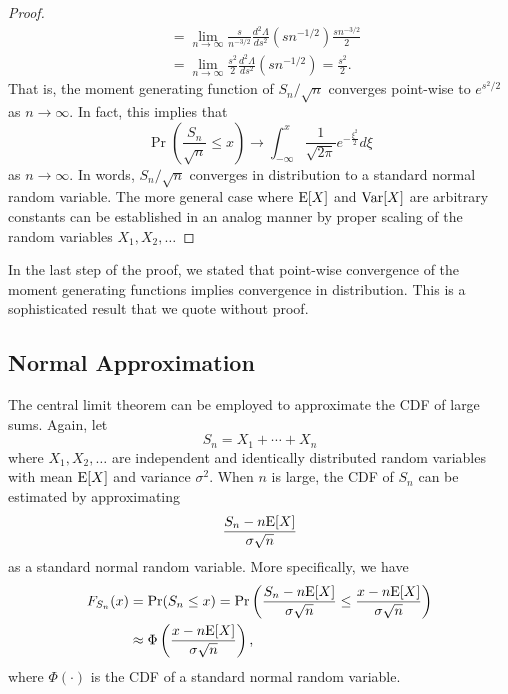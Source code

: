 \begin{proof}
\begin{equation*}
\begin{split}
&= \lim_{n \rightarrow \infty} \frac{s}{n^{-3/2}}
\frac{d^2 \Lambda}{ds^2} \left( s n^{-1/2} \right) \frac{s n^{-3/2}}{2} \\
&= \lim_{n \rightarrow \infty} \frac{s^2}{2}
\frac{d^2 \Lambda}{ds^2} \left( s n^{-1/2} \right) = \frac{s^2}{2} .
\end{split}
\end{equation*}
That is, the moment generating function of $S_n / \sqrt{n}$ converges point-wise to $e^{s^2/2}$ as $n \rightarrow \infty$.
In fact, this implies that
\begin{equation*}
\Pr \left( \frac{S_n}{\sqrt{n}} \leq x \right) \rightarrow \int_{-\infty}^x \frac{1}{\sqrt{2 \pi}} e^{-\frac{\xi^2}{2}} d\xi
\end{equation*}
as $n \rightarrow \infty$.
In words, $S_n / \sqrt{n}$ converges in distribution to a standard normal random variable.
The more general case where $\mathrm{E} [X]$ and $\mathrm{Var} [X]$ are arbitrary constants can be established in an analog manner by proper scaling of the random variables $X_1, X_2, \ldots$
\end{proof}

In the last step of the proof, we stated that point-wise convergence of the moment generating functions implies convergence in distribution.
This is a sophisticated result that we quote without proof.


\subsection{Normal Approximation}

The central limit theorem can be employed to approximate the CDF of large sums.
Again, let
\begin{equation*}
S_n = X_1 + \cdots + X_n
\end{equation*}
where $X_1, X_2, \ldots$ are independent and identically distributed random variables with mean $\mathrm{E} [X]$ and variance $\sigma^2$.
When $n$ is large, the CDF of $S_n$ can be estimated by approximating
\begin{equation*}
\frac{ S_n - n \mathrm{E} [X] } { \sigma \sqrt{n} }
\end{equation*}
as a standard normal random variable.
More specifically, we have
\begin{equation*}
\begin{split}
F_{S_n} (x) 
&= \Pr (S_n \leq x)
= \Pr \left( \frac{ S_n - n \mathrm{E} [X] }{ \sigma \sqrt{n} }
\leq \frac{x - n \mathrm{E} [X]}{\sigma \sqrt{n}} \right) \\
&\approx \Phi \left( \frac{x - n \mathrm{E} [X]}{\sigma \sqrt{n}} \right) ,
\end{split}
\end{equation*}
where $\Phi (\cdot)$ is the CDF of a standard normal random variable.


